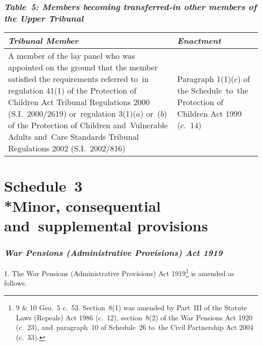 \documentclass[12pt,a4paper]{article}
\begin{document}
\section*{\itshape\sloppy Table~5: Members becoming transferred-in other members of the Upper Tribunal}

{\noindent
\begin{longtable}{p{243.72656pt}p{122.26358pt}}
\hline
\itshape Tribunal	Member & \itshape Enactment\\
\hline
\endhead
\hline
\endlastfoot
A member of the lay panel who was appointed on the ground that the member satisfied the requirements referred to~in regulation 41(1) of the Protection of Children Act Tribunal Regulations 2000 (S.I.~2000/2619) or~regulation 3(1)($a$)  or~($b$)  of the Protection of Children and~Vulnerable Adults and~Care Standards Tribunal Regulations 2002 (S.I.~2002/816)	&Paragraph 1(1)($c$)  of the Schedule~to~the Protection of Children Act 1999 (c.~14)\\
\end{longtable}

}

\vfill

\part[Schedule~3 --- Minor, consequential and~supplemental provisions]{Schedule~3\\*Minor, consequential and~supplemental provisions}

\renewcommand\parthead{--- Schedule~3}

\section*{\itshape\sloppy War Pensions (Administrative Provisions) Act 1919}

1.  The War Pensions (Administrative Provisions) Act 1919\footnote{9 \& 10 Geo.~5 c.~53. Section~8(1) was amended by Part~III of the Statute Laws (Repeals) Act 1986 (c.~12), section~8(2) of the War Pensions Act 1920 (c.~23), and~paragraph~10 of Schedule~26 to~the Civil Partnership Act 2004 (c.~33).} is amended as follows.

\medskip
\end{document}
